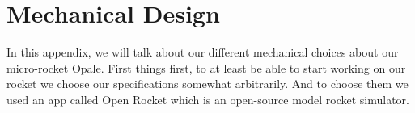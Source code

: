 \chapter{Mechanical Design}\label{annex:mechanical}
In this appendix, we will talk about our different mechanical choices about our micro-rocket Opale.
First things first, to at least be able to start working on our rocket we choose our specifications somewhat arbitrarily. And to choose them we used an app called Open Rocket which is an open-source model rocket simulator.



